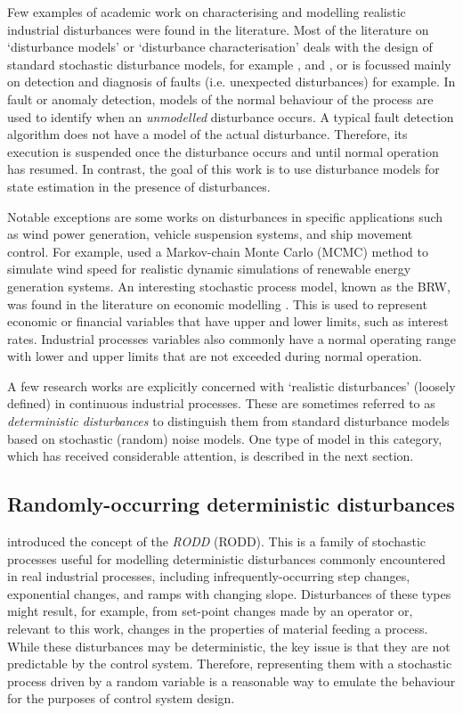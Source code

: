 Few examples of academic work on characterising and modelling realistic industrial disturbances were found in the literature. Most of the literature on `disturbance models' or `disturbance characterisation' deals with the design of standard stochastic disturbance models, for example \cite{muske_disturbance_2002}, and \cite{pannocchia_robust_2003}, or is focussed mainly on detection and diagnosis of faults (i.e. unexpected disturbances) \citep{thornhill_advances_2007} for example. In fault or anomaly detection, models of the normal behaviour of the process are used to identify when an \textit{unmodelled} disturbance occurs. A typical fault detection algorithm does not have a model of the actual disturbance. Therefore, its execution is suspended once the disturbance occurs and until normal operation has resumed. In contrast, the goal of this work is to use disturbance models for state estimation in the presence of disturbances.

Notable exceptions are some works on disturbances in specific applications such as wind power generation, vehicle suspension systems, and ship movement control. For example, \cite{papaefthymiou_mcmc_2008} used a Markov-chain Monte Carlo (MCMC) method to simulate wind speed for realistic dynamic simulations of renewable energy generation systems. An interesting stochastic process model, known as the \gls{BRW}, was found in the literature on economic modelling \citep{nicolau_stationary_2002}. This is used to represent economic or financial variables that have upper and lower limits, such as interest rates. Industrial processes variables also commonly have a normal operating range with lower and upper limits that are not exceeded during normal operation.

A few research works are explicitly concerned with `realistic disturbances' (loosely defined) in continuous industrial processes. These are sometimes referred to as \textit{deterministic disturbances} to distinguish them from standard disturbance models based on stochastic (random) noise models. One type of model in this category, which has received considerable attention, is described in the next section.

\subsection{Randomly-occurring deterministic disturbances} \label{RODDs}

\cite{macgregor_duality_1984} introduced the concept of the \textit{\acrlong{RODD}} (\acrshort{RODD}). This is a family of stochastic processes useful for modelling deterministic disturbances commonly encountered in real industrial processes, including  infrequently-occurring step changes, exponential changes, and ramps with changing slope. Disturbances of these types might result, for example, from set-point changes made by an operator or, relevant to this work, changes in the properties of material feeding a process. While these disturbances may be deterministic, the key issue is that they are not predictable by the control system. Therefore, representing them with a stochastic process driven by a random variable is a reasonable way to emulate the behaviour for the purposes of control system design.

